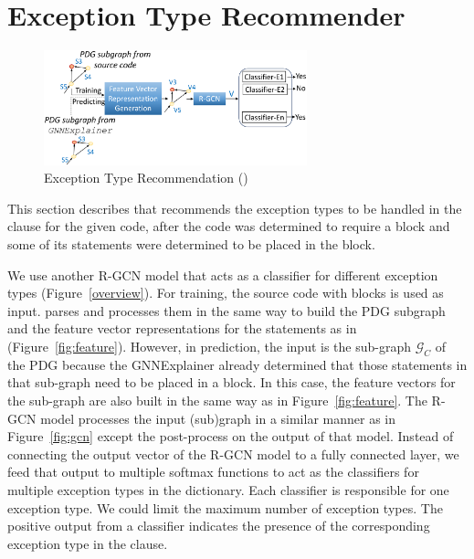 \section{Exception Type Recommender}
\label{sec:type}

\begin{figure}[t]
\begin{center}
\includegraphics[width=3in]{xtype-3.png}
\vspace{-10pt}
\caption{Exception Type Recommendation ({\xtype})}
\label{fig:xtype}
\end{center}
\end{figure}

This section describes {\xtype} that recommends the exception types to
be handled in the  clause for the given code, after the code was
determined to require a  block and some of its
statements were determined to be placed in the  block.

We use another R-GCN model that acts as a classifier for different
exception types (Figure~\ref{overview}). For training, the source code
with  blocks is used as input. {\tool} parses and
processes them in the same way to build the PDG subgraph and the
feature vector representations for the statements as in {\xblock}
(Figure~\ref{fig:feature}). However, in prediction, the input is the
sub-graph $\mathcal{G}_C$ of the PDG because the GNNExplainer already
determined that those statements in that sub-graph need to be placed
in a  block. In this case, the feature vectors for the
sub-graph are also built in the same way as in
Figure~\ref{fig:feature}. The R-GCN model processes the input
(sub)graph in a similar manner as in Figure~\ref{fig:gcn} except the
post-process on the output of that model.  Instead of connecting the
output vector of the R-GCN model to a fully connected layer, we feed
that output to multiple softmax functions to act as the classifiers
for multiple exception types in the dictionary. Each classifier is
responsible for one exception type.  We could limit the maximum number
of exception types. The positive output from a classifier indicates
the presence of the corresponding exception type in the 
clause.
